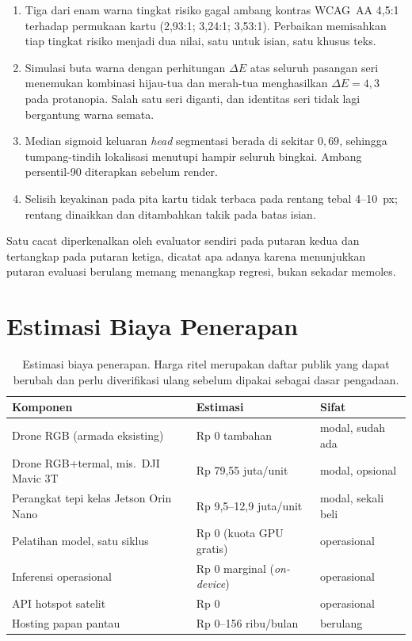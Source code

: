 \begin{enumerate}
\item Tiga dari enam warna tingkat risiko gagal ambang kontras WCAG~AA 4{,}5:1
terhadap permukaan kartu (2{,}93:1; 3{,}24:1; 3{,}53:1). Perbaikan memisahkan
tiap tingkat risiko menjadi dua nilai, satu untuk isian, satu khusus teks.
\item Simulasi buta warna dengan perhitungan $\Delta E$ atas seluruh pasangan
seri menemukan kombinasi hijau-tua dan merah-tua menghasilkan $\Delta E = 4{,}3$
pada protanopia. Salah satu seri diganti, dan identitas seri tidak lagi
bergantung warna semata.
\item Median sigmoid keluaran \emph{head} segmentasi berada di sekitar $0{,}69$,
sehingga tumpang-tindih lokalisasi menutupi hampir seluruh bingkai. Ambang
persentil-90 diterapkan sebelum render.
\item Selisih keyakinan pada pita kartu tidak terbaca pada rentang tebal
4--10~px; rentang dinaikkan dan ditambahkan takik pada batas isian.
\end{enumerate}

Satu cacat diperkenalkan oleh evaluator sendiri pada putaran kedua dan
tertangkap pada putaran ketiga, dicatat apa adanya karena menunjukkan putaran
evaluasi berulang memang menangkap regresi, bukan sekadar memoles.

\section{Estimasi Biaya Penerapan}
\label{app:biaya}

\begin{table}[h]
\caption{Estimasi biaya penerapan. Harga ritel merupakan daftar publik yang
dapat berubah dan perlu diverifikasi ulang sebelum dipakai sebagai dasar
pengadaan.}
\centering
\small
\begin{tabular}{lll}
\hline
\textbf{Komponen} & \textbf{Estimasi} & \textbf{Sifat} \\
\hline
Drone RGB (armada eksisting) & Rp 0 tambahan & modal, sudah ada \\
Drone RGB+termal, mis.\ DJI Mavic 3T & Rp 79{,}55 juta/unit & modal, opsional \\
Perangkat tepi kelas Jetson Orin Nano & Rp 9{,}5--12{,}9 juta/unit & modal, sekali beli \\
Pelatihan model, satu siklus & Rp 0 (kuota GPU gratis) & operasional \\
Inferensi operasional & Rp 0 marginal (\emph{on-device}) & operasional \\
API hotspot satelit & Rp 0 & operasional \\
Hosting papan pantau & Rp 0--156 ribu/bulan & berulang \\
\hline
\end{tabular}
\end{table}

